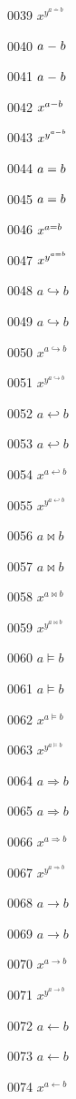 \documentclass{article}
\begin{document}
0039 $x^{y^{a\doteq b}}$\par
0040 $a\relbar b$\par
0041 $\displaystyle a\relbar b$\par
0042 $x^{a\relbar b}$\par
0043 $x^{y^{a\relbar b}}$\par
0044 $a\Relbar b$\par
0045 $\displaystyle a\Relbar b$\par
0046 $x^{a\Relbar b}$\par
0047 $x^{y^{a\Relbar b}}$\par
0048 $a\hookrightarrow b$\par
0049 $\displaystyle a\hookrightarrow b$\par
0050 $x^{a\hookrightarrow b}$\par
0051 $x^{y^{a\hookrightarrow b}}$\par
0052 $a\hookleftarrow b$\par
0053 $\displaystyle a\hookleftarrow b$\par
0054 $x^{a\hookleftarrow b}$\par
0055 $x^{y^{a\hookleftarrow b}}$\par
0056 $a\bowtie b$\par
0057 $\displaystyle a\bowtie b$\par
0058 $x^{a\bowtie b}$\par
0059 $x^{y^{a\bowtie b}}$\par
0060 $a\models b$\par
0061 $\displaystyle a\models b$\par
0062 $x^{a\models b}$\par
0063 $x^{y^{a\models b}}$\par
0064 $a\Longrightarrow b$\par
0065 $\displaystyle a\Longrightarrow b$\par
0066 $x^{a\Longrightarrow b}$\par
0067 $x^{y^{a\Longrightarrow b}}$\par
0068 $a\longrightarrow b$\par
0069 $\displaystyle a\longrightarrow b$\par
0070 $x^{a\longrightarrow b}$\par
0071 $x^{y^{a\longrightarrow b}}$\par
0072 $a\longleftarrow b$\par
0073 $\displaystyle a\longleftarrow b$\par
0074 $x^{a\longleftarrow b}$\par
\end{document}

